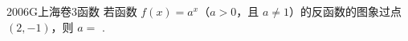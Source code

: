 
\begin{problem}{2006}{G}{上海卷}{3}{函数}
若函数 $ f(x) = a^x $（$ a > 0 $，且 $ a \ne 1 $）的反函数的图象过点 $ (2, -1) $，则 $ a = $ \underline{\hspace{4em}}.
\end{problem}

\begin{answer}

\end{answer}

\begin{solutions}

\end{solutions}